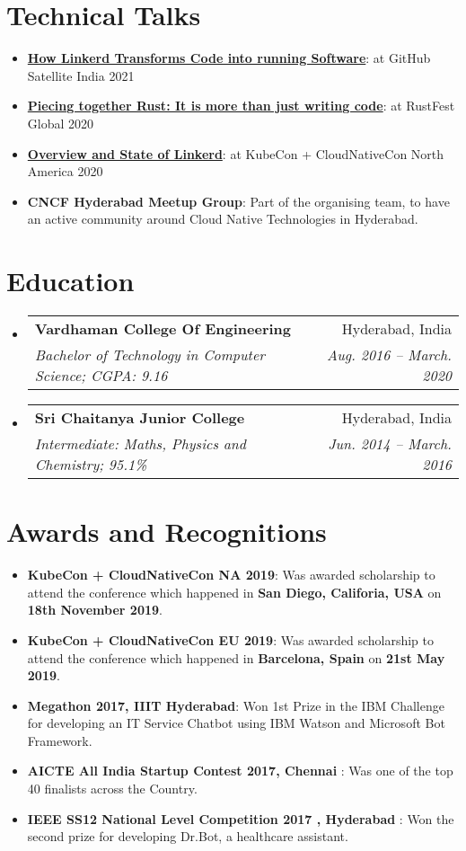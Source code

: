 \documentclass[letterpaper,11pt]{article}
\makeatletter
\newcommand{\resumeItem}[2]{
  \item\small{
    \textbf{#1}{: #2 \vspace{-2pt}}
  }
}
\newcommand{\resumeSubheading}[4]{
  \vspace{-1pt}\item
    \begin{tabular*}{0.97\textwidth}{l@{\extracolsep{\fill}}r}
      \textbf{#1} & #2 \\
      \textit{\small#3} & \textit{\small #4} \\
    \end{tabular*}\vspace{-5pt}
}
\newcommand{\resumeSubItem}[2]{\resumeItem{#1}{#2}\vspace{-4pt}}
\newcommand{\resumeSubHeadingListStart}{\begin{itemize}[leftmargin=*]}
\newcommand{\resumeSubHeadingListEnd}{\end{itemize}}
\makeatother
\begin{document}
\section{Technical Talks}
\resumeSubHeadingListStart
\resumeSubItem{\href{https://www.youtube.com/watch?v=pZnNvU89wes&feature=youtu.be}{How Linkerd Transforms Code into running Software}}{at GitHub Satellite India 2021}
\resumeSubItem{\href{https://www.youtube.com/watch?v=rYp0bUmcbMs}{Piecing together Rust: It is more than just writing code}}{at RustFest Global 2020}
\resumeSubItem{\href{https://www.youtube.com/watch?v=9XlEIURv_3M}{Overview and State of Linkerd}}{at KubeCon + CloudNativeCon North America 2020}
\resumeSubItem{CNCF Hyderabad Meetup Group}{ Part of the organising team, to have an active community around Cloud Native Technologies in Hyderabad. }
\resumeSubHeadingListEnd


\section{Education}
\resumeSubHeadingListStart
\resumeSubheading
{Vardhaman College Of Engineering}{Hyderabad, India}
{Bachelor of Technology in Computer Science;  CGPA: 9.16 }{Aug. 2016 -- March. 2020}
\resumeSubheading
{Sri Chaitanya Junior College}{Hyderabad, India}
{Intermediate: Maths, Physics and Chemistry;  95.1\% }{Jun. 2014 -- March. 2016}
\resumeSubHeadingListEnd



\section{Awards and Recognitions}
\resumeSubHeadingListStart
\resumeSubItem{KubeCon + CloudNativeCon NA 2019}{Was awarded scholarship to attend the conference which happened in \textbf{San Diego, Califoria, USA} on \textbf{18th November 2019}.}
\resumeSubItem{KubeCon + CloudNativeCon EU 2019}{Was awarded scholarship to attend the conference which happened in \textbf{Barcelona, Spain} on \textbf{21st May 2019}.}
\resumeSubItem{Megathon 2017, IIIT Hyderabad}
{Won 1st Prize in the IBM Challenge for developing an IT Service Chatbot using IBM Watson and Microsoft Bot Framework.}
\resumeSubItem{AICTE All India Startup Contest 2017, Chennai }
{Was one of the top 40 finalists across the Country.}
\resumeSubItem{IEEE SS12 National Level Competition 2017 , Hyderabad }
{Won the second prize for developing Dr.Bot, a healthcare assistant.}
\resumeSubHeadingListEnd
\end{document}
